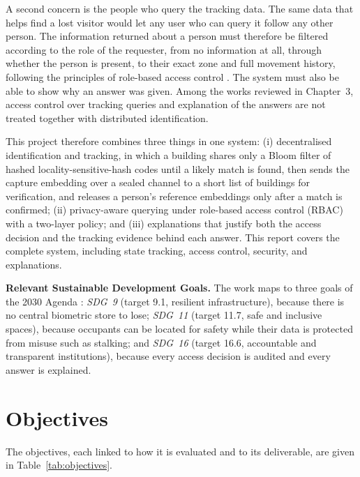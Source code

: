 \documentclass[12pt,a4paper,oneside]{report}
\begin{document}
A second concern is the people who query the tracking data. The same data that helps find a lost visitor would let any user who can query it follow any other person. The information returned about a person must therefore be filtered according to the role of the requester, from no information at all, through whether the person is present, to their exact zone and full movement history, following the principles of role-based access control \cite{ref21}. The system must also be able to show why an answer was given. Among the works reviewed in Chapter~3, access control over tracking queries and explanation of the answers are not treated together with distributed identification.

This project therefore combines three things in one system: (i) decentralised identification and tracking, in which a building shares only a Bloom filter of hashed locality-sensitive-hash codes until a likely match is found, then sends the capture embedding over a sealed channel to a short list of buildings for verification, and releases a person's reference embeddings only after a match is confirmed; (ii) privacy-aware querying under role-based access control (RBAC) with a two-layer policy; and (iii) explanations that justify both the access decision and the tracking evidence behind each answer. This report covers the complete system, including state tracking, access control, security, and explanations.

\textbf{Relevant Sustainable Development Goals.} The work maps to three goals of the 2030 Agenda \cite{ref27}: \emph{SDG~9} (target 9.1, resilient infrastructure), because there is no central biometric store to lose; \emph{SDG~11} (target 11.7, safe and inclusive spaces), because occupants can be located for safety while their data is protected from misuse such as stalking; and \emph{SDG~16} (target 16.6, accountable and transparent institutions), because every access decision is audited and every answer is explained.

\section{Objectives}
The objectives, each linked to how it is evaluated and to its deliverable, are given in Table~\ref{tab:objectives}.
\end{document}
